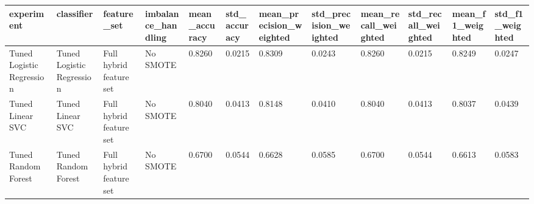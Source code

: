 \begin{tabular}{llllllllllll}
\toprule
experiment & classifier & feature\_set & imbalance\_handling & mean\_accuracy & std\_accuracy & mean\_precision\_weighted & std\_precision\_weighted & mean\_recall\_weighted & std\_recall\_weighted & mean\_f1\_weighted & std\_f1\_weighted \\
\midrule
Tuned Logistic Regression & Tuned Logistic Regression & Full hybrid feature set & No SMOTE & 0.8260 & 0.0215 & 0.8309 & 0.0243 & 0.8260 & 0.0215 & 0.8249 & 0.0247 \\
Tuned Linear SVC & Tuned Linear SVC & Full hybrid feature set & No SMOTE & 0.8040 & 0.0413 & 0.8148 & 0.0410 & 0.8040 & 0.0413 & 0.8037 & 0.0439 \\
Tuned Random Forest & Tuned Random Forest & Full hybrid feature set & No SMOTE & 0.6700 & 0.0544 & 0.6628 & 0.0585 & 0.6700 & 0.0544 & 0.6613 & 0.0583 \\
\bottomrule
\end{tabular}
